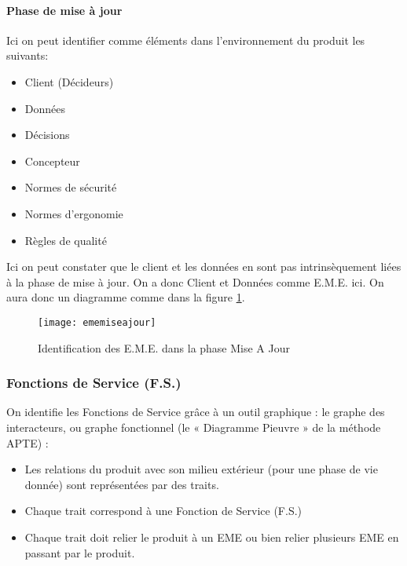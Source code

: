 \paragraph{Phase de mise à jour}
Ici on peut identifier comme éléments dans l'environnement du produit les suivants:
\begin{itemize}
    \item Client (Décideurs) 
    \item Données 
    \item Décisions 
    \item Concepteur
    \item Normes de sécurité 
    \item Normes d'ergonomie
    \item Règles de qualité
\end{itemize}
Ici on peut constater que le client et les données en sont pas intrinsèquement liées à la phase de mise à jour. On a donc Client et Données comme E.M.E. ici. On aura donc un diagramme comme dans la figure \ref{fig:ememiseajour}.


\begin{figure}[H]
    \centering
    \texttt{[image: ememiseajour]}
    \caption{Identification des E.M.E. dans la phase Mise A Jour}
    \label{fig:ememiseajour}
\end{figure}



\subsubsection{Fonctions de Service (F.S.)}
On identifie les Fonctions de Service grâce à un outil graphique : le graphe des interacteurs,
ou graphe fonctionnel (le « Diagramme Pieuvre » de la méthode APTE) :
\begin{itemize}
    \item Les relations du produit avec son milieu extérieur (pour une phase de vie donnée) sont représentées par des traits.
    \item Chaque trait correspond à une Fonction de Service (F.S.)
    \item Chaque trait doit relier le produit à un EME ou bien relier plusieurs EME en passant par le produit.
\end{itemize}


